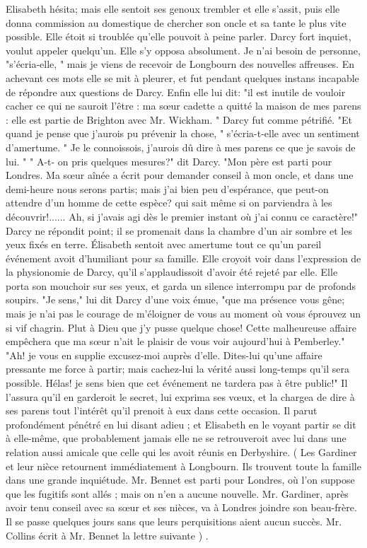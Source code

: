 Elisabeth hésita; mais elle sentoit ses genoux trembler et elle s'assit, puis elle donna commission au domestique de chercher son oncle et sa tante le plus vite possible. Elle étoit si troublée qu'elle pouvoit à peine parler.
Darcy fort inquiet, voulut appeler quelqu'un. Elle s'y opposa absolument. Je n'ai besoin de personne, "s'écria-elle, " mais je viens de recevoir de Longbourn des nouvelles affreuses. En achevant ces mots elle se mit à pleurer, et fut pendant quelques instans incapable de répondre aux questions de Darcy. Enfin elle lui dit: "il est inutile de vouloir cacher ce qui ne sauroit l'être : ma sœur cadette a quitté la maison de mes parens : elle est partie de Brighton avec Mr. Wickham. "
Darcy fut comme pétrifié.
"Et quand je pense que j'aurois pu prévenir la chose, " s'écria-t-elle avec un sentiment d'amertume. " Je le connoissois, j'aurois dû dire à mes parens ce que je savois de lui. "
" A-t- on pris quelques mesures?" dit Darcy.
"Mon père est parti pour Londres. Ma sœur aînée a écrit pour demander conseil\setcounter{page}{116} à mon oncle, et dans une demi-heure nous serons partis; mais j'ai bien peu d'espérance, que peut-on attendre d'un homme de cette espèce? qui sait même si on parviendra à les découvrir!...... Ah, si j'avais agi dès le premier instant où j'ai connu ce caractère!" Darcy ne répondit point; il se promenait dans la chambre d'un air sombre et les yeux fixés en terre. Élisabeth sentoit avec amertume tout ce qu'un pareil événement avoit d'humiliant pour sa famille. Elle croyoit voir dans l'expression de la physionomie de Darcy, qu'il s'applaudissoit d'avoir été rejeté par elle. Elle porta son mouchoir sur ses yeux, et garda un silence interrompu par de profonds soupirs.
"Je sens," lui dit Darcy d'une voix émue, "que ma présence vous gêne; mais je n'ai pas le courage de m'éloigner de vous au moment où vous éprouvez un si vif chagrin. Plut à Dieu que j'y pusse quelque chose! Cette malheureuse affaire empêchera que ma sœur n'ait le plaisir de vous voir aujourd'hui à Pemberley."
"Ah! je vous en supplie excusez-moi auprès d'elle. Dites-lui qu'une affaire pressante me force à partir; mais cachez-lui la vérité aussi long-temps qu'il sera possible. Hélas! je sens bien que cet événement ne tardera pas à être public!"\setcounter{page}{117} Il l'assura qu'il en garderoit le secret, lui exprima ses vœux, et la chargea de dire à ses parens tout l'intérêt qu'il prenoit à eux dans cette occasion. Il parut profondément pénétré en lui disant adieu ; et Elisabeth en le voyant partir se dit à elle-même, que probablement jamais elle ne se retrouveroit avec lui dans une relation aussi amicale que celle qui les avoit réunis en Derbyshire. ( Les Gardiner et leur nièce retournent immédiatement à Longbourn. Ils trouvent toute la famille dans une grande inquiétude. Mr. Bennet est parti pour Londres, où l'on suppose que les fugitifs sont allés ; mais on n'en a aucune nouvelle. Mr. Gardiner, après avoir tenu conseil avec sa sœur et ses nièces, va à Londres joindre son beau-frère. Il se passe quelques jours sans que leurs perquisitions aient aucun succès. Mr. Collins écrit à Mr. Bennet la lettre suivante ) .
